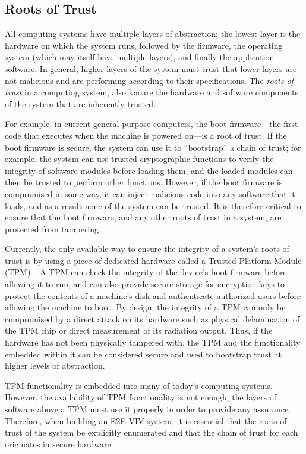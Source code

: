 \subsection{Roots of Trust}

All computing systems have multiple layers of abstraction; the lowest
layer is the hardware on which the system runs, followed by the
firmware, the operating system (which may itself have multiple
layers), and finally the application software. In general, higher
layers of the system must trust that lower layers are not malicious
and are performing according to their specifications. The \emph{roots
  of trust} in a computing system, also knoare the hardware and software
components of the system that are inherently trusted.

For example, in current general-purpose computers, the boot
firmware---the first code that executes when the machine is powered
on---is a root of trust. If the boot firmware is secure, the system
can use it to ``bootstrap'' a chain of trust; for example, the system
can use trusted cryptographic functions to verify the integrity of
software modules before loading them, and the loaded modules can then
be trusted to perform other functions. However, if the boot firmware
is compromised in some way, it can inject malicious code into any
software that it loads, and as a result none of the system can be
trusted. It is therefore critical to ensure that the boot firmware,
and any other roots of trust in a system, are protected from
tampering.

Currently, the only available way to ensure the integrity of a
system's roots of trust is by using a piece of dedicated hardware
called a Trusted Platform Module (TPM)~\cite{TPMSpec}. A TPM can check
the integrity of the device's boot firmware before allowing it to run,
and can also provide secure storage for encryption keys to protect the
contents of a machine's disk and authenticate authorized users before
allowing the machine to boot. By design, the integrity of a TPM can
only be compromised by a direct attack on its hardware such as
physical delamination of the TPM chip or direct measurement of its
radiation output. Thus, if the hardware has not been physically
tampered with, the TPM and the functionality embedded within it can be
considered secure and used to bootstrap trust at higher levels of
abstraction.

TPM functionality is embedded into many of today's computing
systems. However, the availability of TPM functionality is not enough;
the layers of software above a TPM must use it properly in order to
provide any assurance. Therefore, when building an E2E-VIV system, it
is essential that the roots of trust of the system be explicitly
enumerated and that the chain of trust for each originates in secure
hardware.

